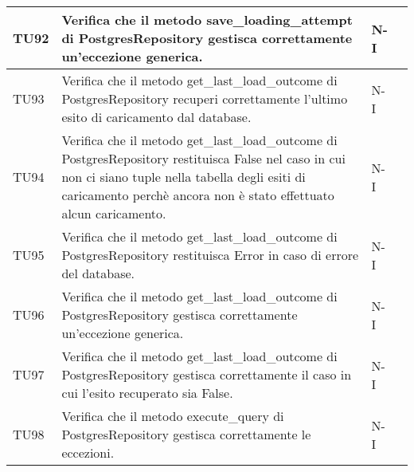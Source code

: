\begin{table}[h!]
\begin{tabularx}{\textwidth}{|p{}|X|p{}|p{}|}
    TU92 & Verifica che il metodo save\_loading\_attempt di PostgresRepository gestisca correttamente un'eccezione generica. &  N-I \\ \hline
    TU93 & Verifica che il metodo get\_last\_load\_outcome di PostgresRepository recuperi correttamente l'ultimo esito di caricamento dal database. &  N-I \\ \hline
    TU94 & Verifica che il metodo get\_last\_load\_outcome di PostgresRepository restituisca False nel caso in cui non ci siano tuple nella tabella degli esiti di caricamento perchè ancora non è stato effettuato alcun caricamento. &  N-I \\ \hline
    TU95 & Verifica che il metodo get\_last\_load\_outcome di PostgresRepository restituisca Error in caso di errore del database. &  N-I \\ \hline
    TU96 & Verifica che il metodo get\_last\_load\_outcome di PostgresRepository gestisca correttamente un'eccezione generica. &  N-I \\ \hline
    TU97 & Verifica che il metodo get\_last\_load\_outcome di PostgresRepository gestisca correttamente il caso in cui l'esito recuperato sia False. &  N-I \\ \hline
    TU98 & Verifica che il metodo execute\_query di PostgresRepository gestisca correttamente le eccezioni. &  N-I \\ \hline

    \end{tabularx}
\end{table}

\newpage

